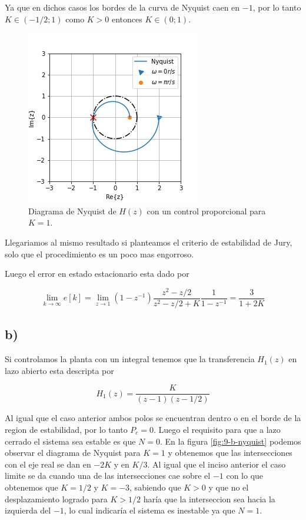 \documentclass{article}
\begin{document}
        Ya que en dichos casos los bordes de la curva de Nyquist caen en $-1$, por lo tanto $K \in (-1/2;1)$ como $K>0$ entonces $K \in (0;1)$.

        \begin{figure}[!htb]
            \centering
            \includegraphics[width=.5\textwidth]{Img/9-a.png}
            \caption{Diagrama de Nyquist de $H(z)$ con un control proporcional para $K=1$.}
            \label{fig:9-a-nyquist}
        \end{figure}

        Llegariamos al mismo resultado si planteamos el criterio de estabilidad de Jury, solo que el procedimiento es un poco mas engorroso.

        Luego el error en estado estacionario esta dado por 

        \begin{equation}
            \lim_{ k \to \infty } e[k] = \lim_{z \to 1} (1 - z^{-1}) \frac{z^2 - z/2}{z^2 - z/2 + K} \frac{1}{1 - z^{-1}} = \frac{3}{1 + 2K}
        \end{equation}

        \subsection{b)}

        Si controlamos la planta con un integral tenemos que la transferencia $H_1(z)$ en lazo abierto esta descripta por 

        \begin{equation}
            H_1(z) = \frac{K}{(z-1)(z-1/2)}
        \end{equation}

        Al igual que el caso anterior ambos polos se encuentran dentro o en el borde de la region de estabilidad, por lo tanto $P_c=0$. Luego 
        el requisito para que a lazo cerrado el sistema sea estable es que $N=0$. En la figura \ref{fig:9-b-nyquist} podemos observar 
        el diagrama de Nyquist para $K=1$ y obtenemos que las intersecciones con el eje real se dan en $-2K$ y en $K/3$. Al 
        igual que el inciso anterior el caso limite se da cuando una de las intersecciones cae sobre el $-1$ con 
        lo que obtenemos que $K=1/2$ y $K=-3$, sabiendo que $K>0$ y que no el desplazamiento logrado para $K>1/2$ haría que 
        la interseccion sea hacia la izquierda del $-1$, lo cual indicaría el sistema es inestable ya que $N=1$.
\end{document}
